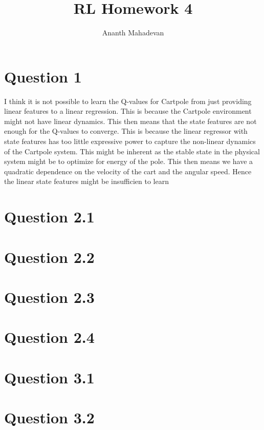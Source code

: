 \documentclass[a4paper]{article}
\title{RL Homework 4}
\author{Ananth Mahadevan}
\begin{document}
\maketitle
\clearpage


\section*{Question 1}
I think it is not possible to learn the Q-values for Cartpole from just providing linear features to a linear regression. This is because the Cartpole environment might not have linear dynamics. This then means that the state features are not enough for the Q-values to converge. This is because the linear regressor with state features has too little expressive power to capture the non-linear dynamics of the Cartpole system. This might be inherent as the stable state in the physical system might be to optimize for energy of the pole. This then means we have a quadratic dependence on the velocity of the cart and the angular speed. Hence the linear state features might be insufficien to learn 
\section*{Question 2.1}
\section*{Question 2.2}
\section*{Question 2.3}
\section*{Question 2.4}
\section*{Question 3.1}
\section*{Question 3.2}
\end{document}
